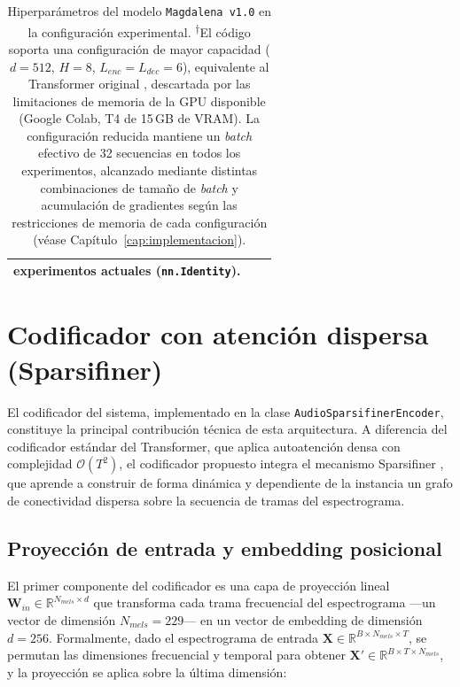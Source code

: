 \begin{table}[H]
\begin{tabular}{l l p{7cm}}
              experimentos actuales (\texttt{nn.Identity}). \\
        \hline
    \end{tabular}
    \caption{Hiperparámetros del modelo \texttt{Magdalena v1.0}
    en la configuración experimental. \textsuperscript{†}El código
    soporta una configuración de mayor capacidad
    ($d = 512$, $H = 8$, $L_{enc} = L_{dec} = 6$), equivalente
    al Transformer original \cite{vaswani2017attention}, descartada
    por las limitaciones de memoria de la GPU disponible
    (Google Colab, T4 de 15\,GB de VRAM). La configuración
    reducida mantiene un \textit{batch} efectivo de 32 secuencias
    en todos los experimentos, alcanzado mediante distintas
    combinaciones de tamaño de \textit{batch} y acumulación de
    gradientes según las restricciones de memoria de cada
    configuración (véase Capítulo~\ref{cap:implementacion}).}
    \label{tab:hiperparametros_globales}
\end{table}

\section{Codificador con atención dispersa (Sparsifiner)}
\label{sec:encoder_sparsifiner}

El codificador del sistema, implementado en la clase \texttt{AudioSparsifinerEncoder},
constituye la principal contribución técnica de esta arquitectura. A diferencia del
codificador estándar del Transformer, que aplica autoatención densa con complejidad
$\mathcal{O}(T^2)$, el codificador propuesto integra el mecanismo Sparsifiner
\cite{wei2023sparsifiner}, que aprende a construir de forma dinámica y dependiente de
la instancia un grafo de conectividad dispersa sobre la secuencia de tramas del
espectrograma.

\subsection{Proyección de entrada y embedding posicional}

El primer componente del codificador es una capa de proyección lineal
$\mathbf{W}_{in} \in \mathbb{R}^{N_{mels} \times d}$ que transforma cada trama
frecuencial del espectrograma —un vector de dimensión $N_{mels} = 229$— en un vector
de embedding de dimensión $d = 256$. Formalmente, dado el espectrograma de entrada
$\mathbf{X} \in \mathbb{R}^{B \times N_{mels} \times T}$, se permutan las dimensiones
frecuencial y temporal para obtener $\mathbf{X}' \in \mathbb{R}^{B \times T \times N_{mels}}$,
y la proyección se aplica sobre la última dimensión:


